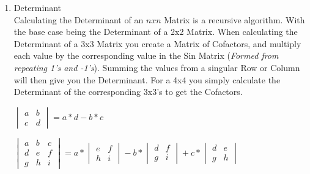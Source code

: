 \begin{flushleft}
\begin{enumerate}
                    \item Determinant \\
                        Calculating the Determinant of an $nxn$ Matrix is a recursive algorithm. With the base case being the Determinant of a 2x2
                        Matrix. When calculating the Determinant of a 3x3 Matrix you create a Matrix of Cofactors, and multiply each 
                        value by the corresponding value in the Sin Matrix (\textit{Formed from repeating 1's and -1's}). Summing the values from
                        a singular Row or Column will then give you the Determinant. For a 4x4 you simply calculate the Determinant of the corresponding
                        3x3's to get the Cofactors.
                        
                        \begin{center}
                            $
                            \begin{vmatrix}
                                a & b\\
                                c & d
                            \end{vmatrix} = 
                                a*d - b*c
                            $
                        \end{center}
                        \vspace{0.25cm}
                        \begin{center}
                            $\begin{vmatrix}
                                a & b & c \\
                                d & e & f \\
                                g & h & i 
                            \end{vmatrix}  = a*
                            \begin{vmatrix}
                                e & f\\
                                h & i
                            \end{vmatrix}
                            -b*
                            \begin{vmatrix}
                                d & f\\
                                g & i
                            \end{vmatrix}
                            +c*
                            \begin{vmatrix}
                                d & e\\
                                g & h
                            \end{vmatrix}$
                        \end{center}
                        \vspace{0.25cm}


\end{enumerate}
\end{flushleft}
